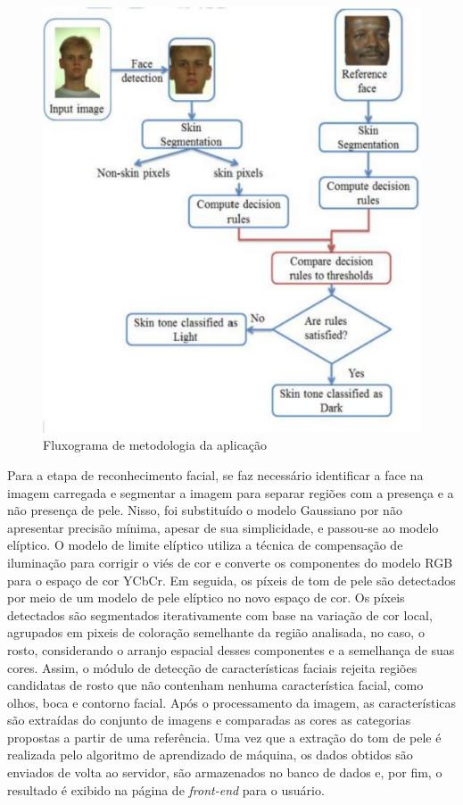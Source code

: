 \begin{figure}[h]
\centering
\caption{Fluxograma de metodologia da aplicação}
\includegraphics[]{Template_Latex_TCC-UNIFTEC/_lib/imagens/human_skin_detection.png}

\label{fig:x human_detection}
\end{figure}

Para a etapa de reconhecimento facial, se faz necessário identificar a face na imagem carregada e segmentar a imagem para separar regiões com a presença e a não presença de pele. Nisso, foi substituído o modelo Gaussiano por não apresentar precisão mínima, apesar de sua simplicidade, e passou-se ao modelo elíptico. O modelo de limite elíptico utiliza a técnica de compensação de iluminação para corrigir o viés de cor e converte os componentes do modelo RGB para o espaço de cor YCbCr. Em seguida, os píxeis de tom de pele são detectados por meio de um modelo de pele elíptico no novo espaço de cor. Os píxeis detectados são segmentados iterativamente com base na variação de cor local, agrupados em pixeis de coloração semelhante da região analisada, no caso, o rosto, considerando o arranjo espacial desses componentes e a semelhança de suas cores. Assim, o módulo de detecção de características faciais rejeita regiões candidatas de rosto que não contenham nenhuma característica facial, como olhos, boca e contorno facial. Após o processamento da imagem, as características são extraídas do conjunto de imagens e comparadas as cores as categorias propostas a partir de uma referência. Uma vez que a extração do tom de pele é realizada pelo algoritmo de aprendizado de máquina, os dados obtidos são enviados de volta ao servidor, são armazenados no banco de dados e, por fim, o resultado é exibido na página de \textit{front-end} para o usuário.

